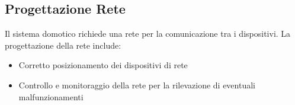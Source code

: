 \documentclass[a4paper,12pt]{article}
\begin{document}
\subsection{Progettazione Rete}
Il sistema domotico richiede una rete per la comunicazione tra i dispositivi. La progettazione della rete include:\begin{itemize}
    \item Corretto posizionamento dei dispositivi di rete
    \item Controllo e monitoraggio della rete per la rilevazione di eventuali malfunzionamenti
\end{itemize}
\end{document}
